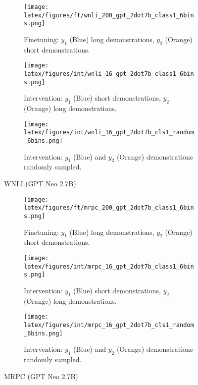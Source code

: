 \begin{figure*}[t!]
    \centering
    \begin{minipage}[t]{\linewidth}
        \begin{subfigure}{0.31\linewidth}
            \centering
            \texttt{[image: latex/figures/ft/wnli\_200\_gpt\_2dot7b\_class1\_6bins.png]}
            \caption{Finetuning: $y_1$ (Blue) long demonstrations, $y_2$ (Orange) short demonstrations.}
        \end{subfigure}%
        \hfill
        \begin{subfigure}{0.31\linewidth}
            \centering
            \texttt{[image: latex/figures/int/wnli\_16\_gpt\_2dot7b\_class1\_6bins.png]}
            \caption{Intervention: $y_1$ (Blue) short demonstrations, $y_2$ (Orange) long demonstrations.}
        \end{subfigure}
        \hfill
        \begin{subfigure}{0.31\linewidth}
            \centering
            \texttt{[image: latex/figures/int/wnli\_16\_gpt\_2dot7b\_cls1\_random\_6bins.png]}
            \caption{Intervention: $y_1$ (Blue) and $y_2$ (Orange) demonstrations randomly sampled.}
        \end{subfigure}
    \end{minipage}%
    \hfill
    \begin{minipage}[c]{\linewidth}
        \caption{WNLI (GPT Neo 2.7B)}
    \end{minipage}
\end{figure*}

\begin{figure*}[t!]
    \centering
    \begin{minipage}[t]{\linewidth}
        \begin{subfigure}{0.31\linewidth}
            \centering
            \texttt{[image: latex/figures/ft/mrpc\_200\_gpt\_2dot7b\_class1\_6bins.png]}
            \caption{Finetuning: $y_1$ (Blue) long demonstrations, $y_2$ (Orange) short demonstrations.}
        \end{subfigure}%
        \hfill
        \begin{subfigure}{0.31\linewidth}
            \centering
            \texttt{[image: latex/figures/int/mrpc\_16\_gpt\_2dot7b\_class1\_6bins.png]}
            \caption{Intervention: $y_1$ (Blue) short demonstrations, $y_2$ (Orange) long demonstrations.}
        \end{subfigure}
        \hfill
        \begin{subfigure}{0.31\linewidth}
            \centering
            \texttt{[image: latex/figures/int/mrpc\_16\_gpt\_2dot7b\_cls1\_random\_6bins.png]}
            \caption{Intervention: $y_1$ (Blue) and $y_2$ (Orange) demonstrations randomly sampled.}
        \end{subfigure}
    \end{minipage}%
    \hfill
    \begin{minipage}[c]{\linewidth}
        \caption{MRPC (GPT Neo 2.7B)}
    \end{minipage}
\end{figure*}

